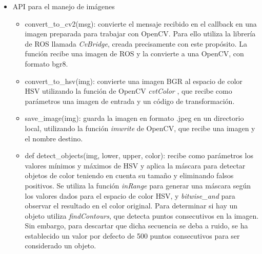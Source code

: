 \documentclass[12pt,spanish,chapterprefix, numbers=noenddot]{book}
\numberwithin{equation}{section}
\numberwithin{figure}{section}
\begin{document}
\begin{itemize}
\item{API para el manejo de imágenes}
    \begin{itemize}
    \item convert\_to\_cv2(msg): convierte el mensaje recibido en el callback en una imagen preparada para trabajar con OpenCV. Para ello utiliza la librería de ROS llamada \textit{CvBridge}\cite{cvbridge}, creada precisamente con este propósito. La función recibe una imagen de ROS y la convierte a una OpenCV, con formato bgr8. 
    \item convert\_to\_hsv(img): convierte una imagen BGR al espacio de color HSV utilizando la función de OpenCV \textit{cvtColor} \cite{cv_imgTransformations}, que recibe como parámetros una imagen de entrada y un código de transformación. 
    \item save\_image(img): guarda la imagen en formato .jpeg en un directorio local, utilizando la función \textit{imwrite} de OpenCV, que recibe una imagen y el nombre destino. 
    \item def detect\_objects(img, lower, upper, color): recibe como parámetros los valores mínimos y máximos de HSV y aplica la máscara para detectar objetos de color teniendo en cuenta su tamaño y eliminando falsos positivos. 
    Se utiliza la función \textit{inRange} para generar una máscara según los valores dados para el espacio de color HSV, y \textit{bitwise\_and} para observar el resultado en el color original. 
    Para determinar si hay un objeto utiliza \textit{findContours}, que detecta puntos consecutivos en la imagen. Sin embargo, para descartar que dicha secuencia se deba a ruido, se ha establecido un valor por defecto de 500 puntos consecutivos para ser considerado un objeto. 
    \end{itemize}
    

\end{itemize}
\end{document}
